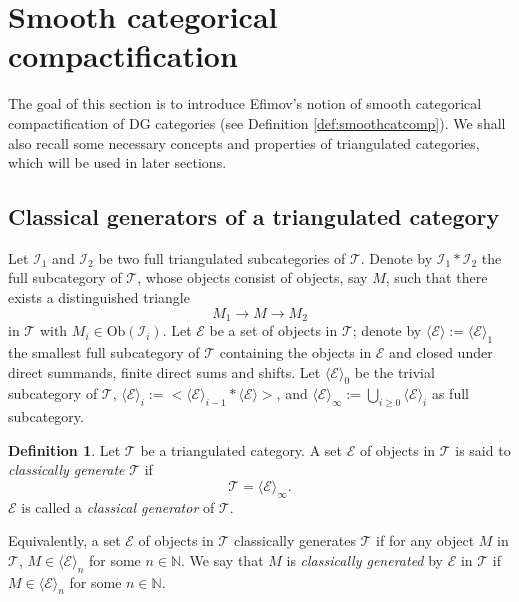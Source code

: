 \documentclass[11pt,reqno]{amsart}
\theoremstyle{definition}
\newtheorem{definition}[theorem]{Definition}
\begin{document}
\section{Smooth categorical compactification}
\label{CT}

The goal of this section is to introduce Efimov's
notion of smooth categorical compactification of 
DG categories (see Definition \ref{def:smoothcatcomp}). 
We shall also
recall some necessary
concepts and properties of triangulated categories,
which will be used in later sections.


\subsection{Classical generators of a triangulated category}

Let $\mathcal{I}_1$ and $\mathcal{I}_2$ be two full triangulated subcategories of $\mathcal{T}$.
Denote by $\mathcal{I}_1 \ast \mathcal{I}_2 $ the full subcategory of $\mathcal{T}$,
whose objects consist of objects, say $M$, such that there exists a distinguished triangle 
$$
M_{1} \longrightarrow M \longrightarrow M_2
$$
in $\mathcal{T}$ with $M_{i} \in \mathrm{Ob}(\mathcal{I}_i)$. 
Let $\mathcal{E}$ be a set of objects in $\mathcal{T}$;
denote by $\langle\mathcal{E}\rangle :=\langle\mathcal{E}\rangle_1$ 
the smallest full subcategory of 
$\mathcal{T}$ containing the objects in $\mathcal{E}$ and closed under 
direct summands, finite direct sums and shifts. 
Let $\langle\mathcal{E}\rangle_0$ be the trivial subcategory of $\mathcal{T}$,
 $\langle\mathcal{E}\rangle_{i} := \big<\langle\mathcal{E}\rangle_{i-1} 
 \ast\langle\mathcal{E}\rangle\big>$, and $\langle
 \mathcal{E}\rangle_{\infty} := \bigcup_{i \geq 0}\langle\mathcal{E}\rangle_{i}$ 
 as full subcategory.

\begin{definition}
Let $\mathcal{T}$ be a triangulated category.
A set $\mathcal{E}$ of objects 
in $\mathcal{T}$ is said to {\it classically generate} $\mathcal{T}$ if
$$
\mathcal{T} = \langle\mathcal{E}\rangle_{\infty}.
$$
$\mathcal{E}$ is called a {\it classical generator} of $\mathcal{T}$. 
\end{definition}


Equivalently, a set $\mathcal{E}$ of objects in $\mathcal{T}$  classically generates
$\mathcal{T}$ if for any object $M$ in $\mathcal{T}$, $M \in \langle 
\mathcal{E}\rangle_{n}$ for some $n \in \mathbb{N}$. We say that $M$
is {\it classically generated} by 
$\mathcal{E}$ in $\mathcal{T}$ if $M \in \langle\mathcal{E}\rangle_{n}$ 
for some $n\in \mathbb{N}$. 
\end{document}
